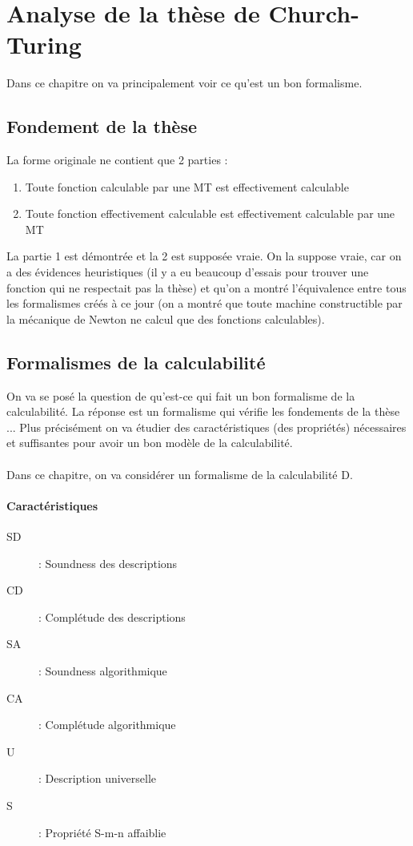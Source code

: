 \section{Analyse de la thèse de Church-Turing}
\label{sec:analyse_de_la_th_se_de_church_turing}
Dans ce chapitre on va principalement voir ce qu'est un bon formalisme.

\subsection{Fondement de la thèse}
\label{sub:fondement_de_la_th_se}
La forme originale ne contient que 2 parties :
\begin{enumerate}
	\item Toute fonction calculable par une MT est effectivement calculable
	\item Toute fonction effectivement calculable est effectivement 
		calculable par une MT 
\end{enumerate}
La partie 1 est démontrée et la 2 est supposée vraie. 
On la suppose vraie, car on a des évidences heuristiques (il y a eu beaucoup 
d'essais pour trouver une fonction qui ne respectait pas la thèse) et qu'on a montré 
l'équivalence entre tous les formalismes créés à ce jour (on a montré que toute 
machine constructible par la mécanique de Newton ne calcul que des fonctions 
calculables). 

\subsection{Formalismes de la calculabilité}
\label{sub:formalismes_de_la_calculabilit_}
On va se posé la question de qu'est-ce qui fait un bon formalisme de la 
calculabilité. La réponse est un formalisme qui vérifie les fondements de la 
thèse ... Plus précisément on va étudier des caractéristiques (des propriétés) 
nécessaires et suffisantes pour avoir un bon modèle de la calculabilité.

\paragraph{} Dans ce chapitre, on va considérer un formalisme de la 
calculabilité D.

\paragraph{Caractéristiques} 
\begin{description}
	\item[SD] : Soundness des descriptions
	\item[CD] : Complétude des descriptions
	\item[SA] : Soundness algorithmique
	\item[CA] : Complétude algorithmique
	\item[U] : Description universelle
	\item[S] : Propriété S-m-n affaiblie
\end{description}


